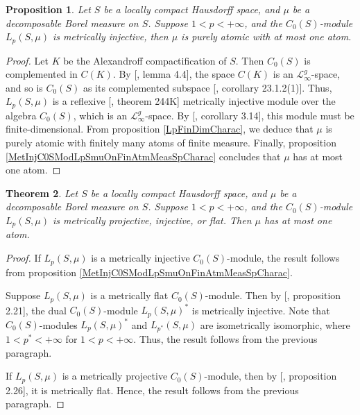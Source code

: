 \documentclass[12pt]{article}
\newtheorem{theorem}{Theorem}[section]
\newtheorem{proposition}[theorem]{Proposition}
\begin{document}
\begin{proposition}\label{MetInjC0SModLpSmuCharac}
    Let $S$ be a locally compact Hausdorff space, and $\mu$ be a decomposable 
    Borel measure on $S$. Suppose $1 < p < +\infty$, and 
    the $C_0(S)$-module $L_p(S,\mu)$ is metrically injective, 
    then $\mu$ is purely atomic with at most one atom.
\end{proposition}
\begin{proof} 
    Let $K$ be the Alexandroff compactification of $S$. 
    Then $C_0(S)$ is complemented in $C(K)$. 
    By [\cite{DefFloTensNorOpId}, lemma 4.4], the space $C(K)$ is 
    an $\mathscr{L}_\infty^g$-space, and so is $C_0(S)$ as its complemented 
    subspace [\cite{DefFloTensNorOpId}, corollary 23.1.2(1)]. 
    Thus, $L_p(S,\mu)$ is a reflexive [\cite{FremMeasTh2}, theorem 244K] 
    metrically injective module over the algebra $C_0(S)$, which is 
    an $\mathscr{L}_\infty^g$-space. 
    By [\cite{NemGeomProjInjFlatBanMod}, corollary 3.14], this module must be 
    finite-dimensional. From proposition \ref{LpFinDimCharac}, we 
    deduce that $\mu$ is purely atomic with finitely many atoms of finite 
    measure. Finally, proposition \ref{MetInjC0SModLpSmuOnFinAtmMeasSpCharac} 
    concludes that $\mu$ has at most one atom.
\end{proof}

\begin{theorem}\label{MetInjPlotjFlatC0SModLpSmuCharac}
    Let $S$ be a locally compact Hausdorff space, and $\mu$ be a decomposable 
    Borel measure on $S$. Suppose $1 < p < +\infty$, and 
    the $C_0(S)$-module $L_p(S,\mu)$ is metrically projective, injective, or 
    flat. Then $\mu$ has at most one atom.
\end{theorem}
\begin{proof} 
    If $L_p(S,\mu)$ is a metrically injective $C_0(S)$-module, the result 
    follows from proposition \ref{MetInjC0SModLpSmuOnFinAtmMeasSpCharac}. 
    
    Suppose $L_p(S,\mu)$ is a metrically flat $C_0(S)$-module. Then 
    by [\cite{NemGeomProjInjFlatBanMod}, proposition 2.21], the 
    dual $C_0(S)$-module $L_p(S,\mu)^*$ is metrically injective. Note 
    that $C_0(S)$-modules $L_p(S,\mu)^*$ and $L_{p^*}(S,\mu)$ are 
    isometrically isomorphic, where $1 < p^* < +\infty$ for $1 < p < +\infty$. 
    Thus, the result follows from the previous paragraph.
    
    If $L_p(S,\mu)$ is a metrically projective $C_0(S)$-module, then 
    by [\cite{NemGeomProjInjFlatBanMod}, proposition 2.26], it is metrically 
    flat. Hence, the result follows from the previous paragraph.
\end{proof}
\end{document}
